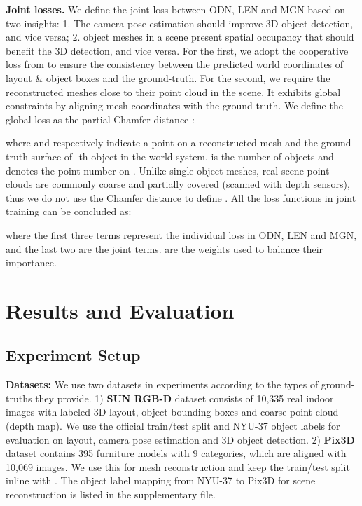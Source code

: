 \documentclass[10pt,twocolumn,letterpaper]{article}
\begin{document}
\noindent\textbf{Joint losses.} We define the joint loss between ODN, LEN and MGN based on two insights: 1. The camera pose estimation should improve 3D object detection, and vice versa; 2. object meshes in a scene present spatial occupancy that should benefit the 3D detection, and vice versa. For the first, we adopt the cooperative loss  from \cite{huang2018cooperative} to ensure the consistency between the predicted world coordinates of layout \& object boxes and the ground-truth. For the second, we require the reconstructed meshes close to their point cloud in the scene. It exhibits global constraints by aligning mesh coordinates with the ground-truth. We define the global loss as the partial Chamfer distance \cite{groueix2018}:


where  and  respectively indicate a point on a reconstructed mesh  and the ground-truth surface  of -th object in the world system.  is the number of objects and  denotes the point number on . Unlike single object meshes, real-scene point clouds are commonly coarse and partially covered (scanned with depth sensors), thus we do not use the Chamfer distance to define . All the loss functions in joint training can be concluded as:

where the first three terms represent the individual loss in ODN, LEN and MGN, and the last two are the joint terms.  are the weights used to balance their importance.

\section{Results and Evaluation}
\subsection{Experiment Setup}
\label{sec:exp}
\noindent \textbf{Datasets:} We use two datasets in experiments according to the types of ground-truths they provide.
1) \textbf{SUN RGB-D} dataset \cite{song2015sun} consists of 10,335 real indoor images with labeled 3D layout, object bounding boxes and coarse point cloud (depth map). 
We use the official train/test split and NYU-37 object labels \cite{silberman2012indoor} for evaluation on layout, camera pose estimation and 3D object detection. 
2) \textbf{Pix3D} dataset \cite{sun2018pix3d} contains 395 furniture models with 9 categories, which are aligned with 10,069 images. We use this for mesh reconstruction and keep the train/test split inline with \cite{gkioxari2019mesh}. The object label mapping from NYU-37 to Pix3D for scene reconstruction is listed in the supplementary file.
\end{document}
